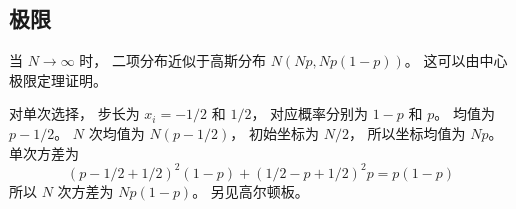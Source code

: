 \subsection{极限}
当 $N\to\infty$ 时， 二项分布近似于高斯分布 $N(Np, Np(1-p))$。 这可以由中心极限定理证明。

对单次选择， 步长为 $x_i = -1/2$ 和 $1/2$， 对应概率分别为 $1-p$ 和 $p$。 均值为 $p - 1/2$。 $N$ 次均值为 $N(p - 1/2)$， 初始坐标为 $N/2$， 所以坐标均值为 $Np$。 单次方差为
\begin{equation}
(p-1/2+1/2)^2(1-p) + (1/2 - p + 1/2)^2 p = p(1-p)
\end{equation}
所以 $N$ 次方差为 $Np(1-p)$。 另见高尔顿板。
